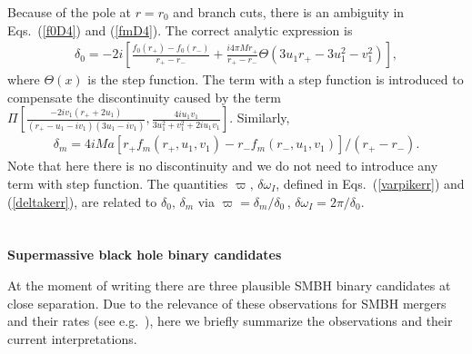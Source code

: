 \documentclass[]{iopart}
\def\beq{\begin{eqnarray}}
\def\eeq{\end{eqnarray}}
\begin{document}
%
Because of the pole at $r=r_0$ and branch cuts, there is an ambiguity in
Eqs.~(\ref{f0D4}) and (\ref{fmD4}). The correct analytic expression is
%
\beq
\delta_0 = -2i\left[
\frac{f_0(r_+) - f_0(r_-)}{r_+ - r_-} + \frac{i4\pi M r_+}{r_+ - r_-} 
\Theta(3u_1 r_+ - 3 u_1^2 - v_1^2) \right],
\eeq
%
where $\Theta(x)$ is the step function.  The term with a step function is
introduced to compensate the discontinuity caused by the term
$\Pi\left[\frac{-2i v_1(r_+ + 2u_1)}{(r_+ - u_1 - iv_1)(3u_1-iv_1)},\frac{4i
    u_1 v_1}{3u_1^2+v_1^2+2i u_1 v_1}\right]$. Similarly,
%
\beq 
\delta_m = 4iMa \left[r_+ f_m(r_+,u_1,v_1) - r_- f_m(r_-,u_1,v_1) \right]
/(r_+ - r_-).
\eeq 
%
Note that here there is no discontinuity and we do not need to introduce any
term with step function.  The quantities $\varpi,\,\delta \omega_I$, defined
in Eqs.~(\ref{varpikerr}) and (\ref{deltakerr}), are related to
$\delta_0,\,\delta_m$ via $\varpi=\delta_m/\delta_0\,,\, \delta
\omega_I=2\pi/\delta_0$.

\section{\label{app:SMBHB}}
{\bf Supermassive black hole binary candidates}
\vskip 2mm

\noindent
At the moment of writing there are three plausible SMBH binary candidates at
close separation. Due to the relevance of these observations for SMBH mergers
and their rates (see e.g.~\cite{Volonteri:2009nh}), here we briefly summarize
the observations and their current interpretations.
\end{document}
